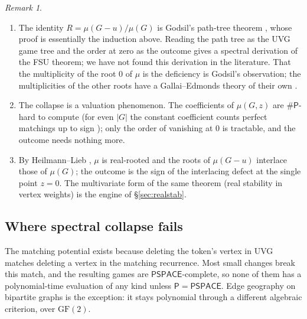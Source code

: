 \documentclass[11pt]{amsart}
\theoremstyle{plain}
\theoremstyle{definition}
\theoremstyle{remark}
\newtheorem*{remark*}{Remark}
\numberwithin{equation}{section}
\newcommand{\cls}[1]{\mathsf{#1}}
\newcommand{\PSPACE}{\cls{PSPACE}}
\newcommand{\Pclass}{\cls{P}}
\newcommand{\sharpP}{\#\cls{P}}
\begin{document}
\begin{remark*}
\begin{enumerate}[label=(\arabic*)]
\item The identity $R=\mu(G-u)/\mu(G)$ is Godsil's path-tree theorem \cite{Godsil81,GodsilBook}, whose proof is essentially the induction above. Reading the path tree as the UVG game tree and the order at zero as the outcome gives a spectral derivation of the FSU theorem; we have not found this derivation in the literature. That the multiplicity of the root $0$ of $\mu$ is the deficiency is Godsil's observation; the multiplicities of the other roots have a Gallai--Edmonds theory of their own \cite{Godsil95,KuChen}.
\item The collapse is a valuation phenomenon. The coefficients of $\mu(G,z)$ are $\sharpP$-hard to compute (for even $|G|$ the constant coefficient counts perfect matchings up to sign \cite{Valiant}); only the order of vanishing at $0$ is tractable, and the outcome needs nothing more.
\item By Heilmann--Lieb \cite{HeilmannLieb}, $\mu$ is real-rooted and the roots of $\mu(G-u)$ interlace those of $\mu(G)$; the outcome is the sign of the interlacing defect at the single point $z=0$. The multivariate form of the same theorem (real stability in vertex weights) is the engine of \S\ref{sec:realstab}.
\end{enumerate}
\end{remark*}

\subsection{Where spectral collapse fails}\label{ssec:fails}
The matching potential exists because deleting the token's vertex in UVG matches deleting a vertex in the matching recurrence. Most small changes break this match, and the resulting games are $\PSPACE$-complete, so none of them has a polynomial-time evaluation of any kind unless $\Pclass=\PSPACE$. Edge geography on bipartite graphs is the exception: it stays polynomial through a different algebraic criterion, over $\mathrm{GF}(2)$.
\end{document}
